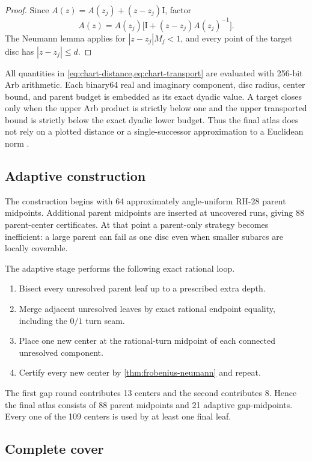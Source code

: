 \documentclass[11pt]{article}
\theoremstyle{definition}
\theoremstyle{remark}
\newcommand{\Id}{\mathrm I}
\begin{document}
\begin{proof}
Since $A(z)=A(z_j)+(z-z_j)\Id$, factor
\[
 A(z)=A(z_j)\bigl[\Id+(z-z_j)A(z_j)^{-1}\bigr].
\]
The Neumann lemma applies for $|z-z_j|M_j<1$, and every point of the target
disc has $|z-z_j|\leq d$.
\end{proof}

All quantities in \cref{eq:chart-distance,eq:chart-transport} are evaluated
with 256-bit Arb arithmetic.  Each binary64 real and imaginary component,
disc radius, center bound, and parent budget is embedded as its exact dyadic
value.  A target closes only when the upper Arb product is strictly below
one and the upper transported bound is strictly below the exact dyadic lower
budget.  Thus the final atlas does not rely on a plotted distance or a
single-successor approximation to a Euclidean norm \citep{Johansson2017}.

\subsection{Adaptive construction}

The construction begins with 64 approximately angle-uniform RH-28 parent
midpoints.  Additional parent midpoints are inserted at uncovered runs,
giving 88 parent-center certificates.  At that point a parent-only strategy
becomes inefficient: a large parent can fail as one disc even when smaller
subarcs are locally coverable.

The adaptive stage performs the following exact rational loop.

\begin{enumerate}
 \item Bisect every unresolved parent leaf up to a prescribed extra depth.
 \item Merge adjacent unresolved leaves by exact rational endpoint equality,
       including the $0/1$ turn seam.
 \item Place one new center at the rational-turn midpoint of each connected
       unresolved component.
 \item Certify every new center by \cref{thm:frobenius-neumann} and repeat.
\end{enumerate}

The first gap round contributes 13 centers and the second contributes 8.
Hence the final atlas consists of 88 parent midpoints and 21 adaptive
gap-midpoints.  Every one of the 109 centers is used by at least one final
leaf.

\subsection{Complete cover}
\end{document}
